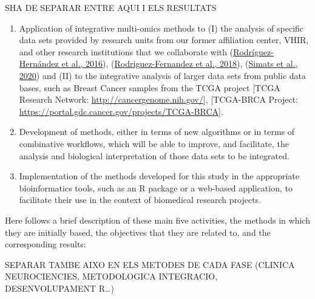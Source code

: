 \documentclass[a4paper, nobind]{templates/ociamthesis}
\begin{document}
\bigskip

SHA DE SEPARAR ENTRE AQUI I ELS RESULTATS

\begin{enumerate}
\def\labelenumi{\arabic{enumi}.}
\item
  Application of integrative multi-omics methods to (I) the analysis of specific data sets provided by research units from our former affiliation center, VHIR, and other research institutions that we collaborate with (\protect\hyperlink{ref-rodriguez-hernandez_cinacalcet_2016}{Rodríguez-Hernández et al., 2016}), (\protect\hyperlink{ref-rodriguez-fernandez_phosphatidyl_2018}{Rodriguez-Fernandez et al., 2018}), (\protect\hyperlink{ref-simats_mouse_2020}{Simats et al., 2020}) and (II) to the integrative analysis of larger data sets from public data bases, such as Breast Cancer samples from the TCGA project {[}TCGA Research Network: \url{http://cancergenome.nih.gov/}{]}, {[}TCGA-BRCA Project: \url{https://portal.gdc.cancer.gov/projects/TCGA-BRCA}{]}.
\item
  Development of methods, either in terms of new algorithms or in terms of combinative workflows, which will be able to improve, and facilitate, the analysis and biological interpretation of those data sets to be integrated.
\item
  Implementation of the methods developed for this study in the appropriate bioinformatics tools, such as an R package or a web-based application, to facilitate their use in the context of biomedical research projects.
\end{enumerate}

Here follows a brief description of these main five activities, the methods in which they are initially based, the objectives that they are related to, and the corresponding results:

\bigskip

SEPARAR TAMBE AIXO EN ELS METODES DE CADA FASE (CLINICA NEUROCIENCIES, METODOLOGICA INTEGRACIO, DESENVOLUPAMENT R\ldots)
\end{document}

